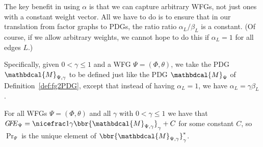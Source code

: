 \documentclass[letterpaper]{article} %
\theoremstyle{plain}
\theoremstyle{definition}
\theoremstyle{remark}
\newcommand{\begthm}[3][]{\begin{#2}[{name=#1},restate=#3,label=#3]}
\newcommand{\thickD}{I\mkern-8muD}
\newcommand{\kldiv}{\thickD\infdivx}
\newcommand{\V}{\mathcal V}
\newcommand{\dg}[1]{\mathbdcal{#1}}
\newcommand{\PDGof}[1]{{\dg M}_{#1}}
\newcommand\GFE{\mathit{G\mkern-4mu F\mkern-4.5mu E}}
\begin{document}
{%
The key benefit in using $\alpha$ is that we can
capture arbitrary WFGs, not just ones with a constant weight
vector.    All we have to do is to ensure that in our translation from
factor graphs to PDGs, the ratio ratio $\alpha_L/\beta_L$ is a
constant.  (Of course, if we allow arbitrary weights, we cannot hope
to do this if $\alpha_L = 1$ for all edges $L$.)

Specifically, given
$0 < \gamma \le 1$ and a WFG $\Psi = (\Phi,\theta)$, we take the PDG
${\dg M}_{\Psi,\gamma}$ to be defined just like the PDG ${\dg M}_\Psi$ of
Definition~\ref{def:fg2PDG}, except that instead of having $\alpha_L =
1$, we have $\alpha_L = \gamma\beta_L$. 


	\begthm{theorem}{thm:fg-is-pdg2}
For all WFGs $\Psi = (\Phi,\theta)$ and all $\gamma$ with $0
< \gamma \le 1$
	we have that
$\GFE_\Psi = \nicefrac1{\gamma} \bbr{\PDGof{\Psi,\gamma}}_{\gamma} + C$  
for some constant $C$, so
$\Pr_{\Psi}$ is the unique element of
$\bbr{\PDGof{\Psi,\gamma}}_{\gamma}^*$.  
	\end{theorem}
}%
\end{document}
